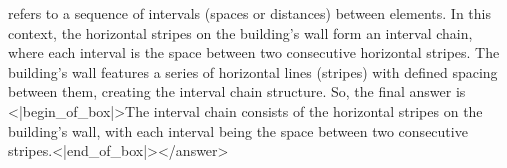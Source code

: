 refers to a sequence of intervals (spaces or distances) between elements. In this context, the horizontal stripes on the building’s wall form an interval chain, where each interval is the space between two consecutive horizontal stripes. The building’s wall features a series of horizontal lines (stripes) with defined spacing between them, creating the interval chain structure.  
So, the final answer is <|begin_of_box|>The interval chain consists of the horizontal stripes on the building's wall, with each interval being the space between two consecutive stripes.<|end_of_box|></answer>